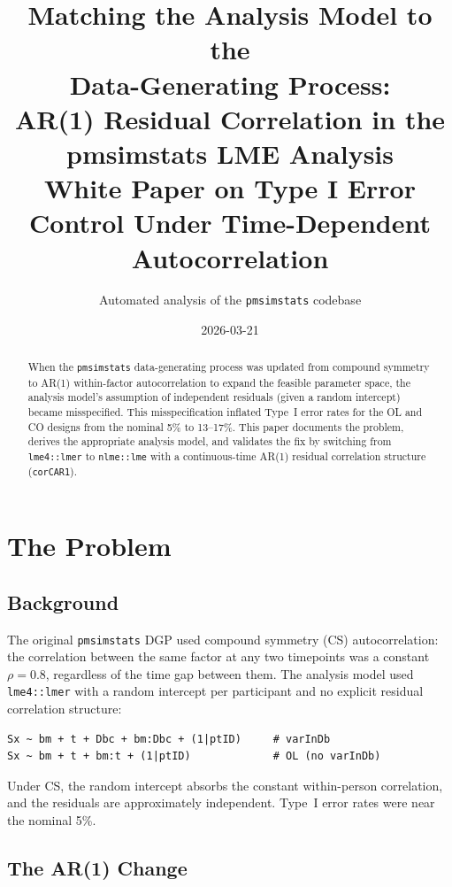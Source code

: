 \documentclass[11pt]{article}
\title{Matching the Analysis Model to the\\
       Data-Generating Process:\\
       AR(1) Residual Correlation in the\\
       pmsimstats LME Analysis\\[6pt]
       \large White Paper on Type I Error Control Under
       Time-Dependent Autocorrelation}
\author{Automated analysis of the \texttt{pmsimstats} codebase}
\date{2026-03-21}
\begin{document}
\maketitle
\thispagestyle{fancy}

\begin{abstract}
When the \texttt{pmsimstats} data-generating process was
updated from compound symmetry to AR(1) within-factor
autocorrelation to expand the feasible parameter space, the
analysis model's assumption of independent residuals (given
a random intercept) became misspecified. This misspecification
inflated Type~I error rates for the OL and CO designs from the
nominal 5\% to 13--17\%. This paper documents the problem,
derives the appropriate analysis model, and validates the fix
by switching from \texttt{lme4::lmer} to \texttt{nlme::lme}
with a continuous-time AR(1) residual correlation structure
(\texttt{corCAR1}).
\end{abstract}

\tableofcontents
\newpage

\section{The Problem}

\subsection{Background}

The original \texttt{pmsimstats} DGP used compound symmetry
(CS) autocorrelation: the correlation between the same factor
at any two timepoints was a constant $\rho = 0.8$, regardless
of the time gap between them. The analysis model used
\texttt{lme4::lmer} with a random intercept per participant
and no explicit residual correlation structure:

\begin{verbatim}
Sx ~ bm + t + Dbc + bm:Dbc + (1|ptID)     # varInDb
Sx ~ bm + t + bm:t + (1|ptID)             # OL (no varInDb)
\end{verbatim}

Under CS, the random intercept absorbs the constant
within-person correlation, and the residuals are approximately
independent. Type~I error rates were near the nominal 5\%.

\subsection{The AR(1) Change}
\end{document}
